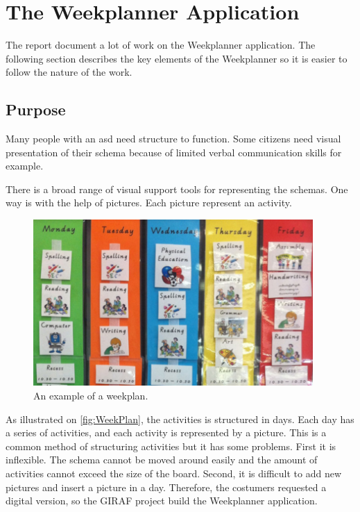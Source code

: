 \section{The Weekplanner Application}\label{sec:TheWeekplannerApplication}

The report document a lot of work on the Weekplanner application. The following section describes the key elements of the Weekplanner so it is easier to follow the nature of the work.

\subsection{Purpose}
Many people with an \gls{asd} need structure to function. Some \glspl{citizen} need visual presentation\cite{VisualSupport} of their schema because of limited verbal communication skills for example. 

There is a broad range of visual support tools for representing the schemas. One way is with the help of pictures. Each picture represent an activity.

\begin{figure}[H]
    \begin{center}
        \includegraphics[width=0.95\textwidth]{figures/WeekPlanEks.png}
    \end{center}
    \caption{An example of a weekplan.\cite{VisualSupport}}
    \label{fig:WeekPlan}
\end{figure}

As illustrated on \autoref{fig:WeekPlan}, the activities is structured in days. Each day has a series of activities, and each activity is represented by a picture.
This is a common method of structuring activities but it has some problems. First it is inflexible. The schema cannot be moved around easily and the amount of activities cannot exceed the size of the board. Second, it is difficult to add new pictures and insert a picture in a day. 
Therefore, the costumers requested a digital version, so the GIRAF project build the Weekplanner application.

